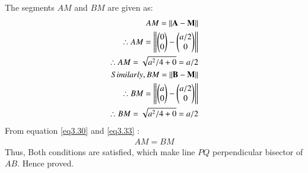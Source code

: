 \documentclass[journal,12pt,twocolumn]{IEEEtran}
\begin{document}
The segments $AM$ and $BM$ are given as:
\begin{align}
    AM=\left\lVert\mathbf{A}-\mathbf{M}\right\rVert \\
    \therefore AM=\left\lVert\begin{pmatrix}0\\0\end{pmatrix}-\begin{pmatrix}a/2\\0\end{pmatrix}\right\rVert\\
    \therefore AM=\sqrt{a^2/4+0}=a/2 \label{eq3.30}\\
    Similarly,BM=\left\lVert\mathbf{B}-\mathbf{M}\right\rVert \\
    \therefore BM=\left\lVert\begin{pmatrix}a\\0\end{pmatrix}-\begin{pmatrix}a/2\\0\end{pmatrix}\right\rVert\\
    \therefore BM=\sqrt{a^2/4+0}=a/2\label{eq3.33}
\end{align}
From equation \ref{eq3.30} and \ref{eq3.33} :
\begin{align}
    AM=BM \label{eq3.35}
\end{align}
Thus, Both conditions are satisfied, which make line $PQ$ perpendicular bisector of $AB$. Hence proved.
\end{document}
